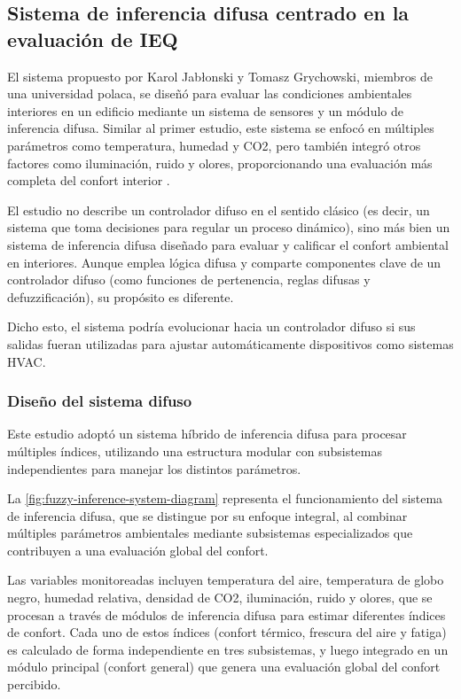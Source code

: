 \subsection{Sistema de inferencia difusa centrado en la evaluación de IEQ}

El sistema propuesto por Karol Jabłonski y Tomasz Grychowski, miembros de una universidad polaca, se diseñó para evaluar las condiciones ambientales interiores en un edificio mediante un sistema de sensores y un módulo de inferencia difusa. Similar al primer estudio, este sistema se enfocó en múltiples parámetros como temperatura, humedad y CO2, pero también integró otros factores como iluminación, ruido y olores, proporcionando una evaluación más completa del confort interior \parencite{jablonski2018fuzzy}.

El estudio no describe un controlador difuso en el sentido clásico (es decir, un sistema que toma decisiones para regular un proceso dinámico), sino más bien un sistema de inferencia difusa diseñado para evaluar y calificar el confort ambiental en interiores. Aunque emplea lógica difusa y comparte componentes clave de un controlador difuso (como funciones de pertenencia, reglas difusas y defuzzificación), su propósito es diferente.

Dicho esto, el sistema podría evolucionar hacia un controlador difuso si sus salidas fueran utilizadas para ajustar automáticamente dispositivos como sistemas HVAC.

\subsubsection{Diseño del sistema difuso}

Este estudio adoptó un sistema híbrido de inferencia difusa para procesar múltiples índices, utilizando una estructura modular con subsistemas independientes para manejar los distintos parámetros.

La \autoref{fig:fuzzy-inference-system-diagram} representa el funcionamiento del sistema de inferencia difusa, que se distingue por su enfoque integral, al combinar múltiples parámetros ambientales mediante subsistemas especializados que contribuyen a una evaluación global del confort. 

Las variables monitoreadas incluyen temperatura del aire, temperatura de globo negro, humedad relativa, densidad de CO2, iluminación, ruido y olores, que se procesan a través de módulos de inferencia difusa para estimar diferentes índices de confort. Cada uno de estos índices (confort térmico, frescura del aire y fatiga) es calculado de forma independiente en tres subsistemas, y luego integrado en un módulo principal (confort general) que genera una evaluación global del confort percibido.

